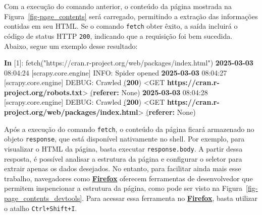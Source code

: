 \documentclass[
  12pt,
  a4paper,
]{scrreprt}
\newenvironment{Shaded}{}{}
\newcommand{\ErrorTok}[1]{\textcolor[rgb]{1.00,0.33,0.33}{\underline{#1}}}
\newcommand{\ExtensionTok}[1]{\textcolor[rgb]{0.84,0.23,0.29}{\textbf{#1}}}
\newcommand{\KeywordTok}[1]{\textcolor[rgb]{0.84,0.23,0.29}{#1}}
\newcommand{\NormalTok}[1]{\textcolor[rgb]{0.14,0.16,0.18}{#1}}
\newcommand{\OperatorTok}[1]{\textcolor[rgb]{0.14,0.16,0.18}{#1}}
\newcommand{\PreprocessorTok}[1]{\textcolor[rgb]{0.84,0.23,0.29}{#1}}
\newcommand{\SpecialStringTok}[1]{\textcolor[rgb]{0.01,0.18,0.38}{#1}}
\newcommand{\StringTok}[1]{\textcolor[rgb]{0.01,0.18,0.38}{#1}}
\begin{document}
Com a execução do comando anterior, o conteúdo da página mostrada na
Figura~\ref{fig-page_contents} será carregado, permitindo a extração das
informações contidas em seu HTML. Se o comando \texttt{fetch} obter
êxito, a saída incluirá o código de status HTTP \texttt{200}, indicando
que a requisição foi bem sucedida. Abaixo, segue um exemplo desse
resultado:

\begin{Shaded}
\begin{Highlighting}[]
\ExtensionTok{In} \PreprocessorTok{[}\SpecialStringTok{1}\PreprocessorTok{]}\NormalTok{: fetch}\ErrorTok{(}\StringTok{"https://cran.r{-}project.org/web/packages/index.html"}\KeywordTok{)}
\ExtensionTok{2025{-}03{-}03}\NormalTok{ 08:04:24 }\PreprocessorTok{[}\SpecialStringTok{scrapy.core.engine}\PreprocessorTok{]}\NormalTok{ INFO: Spider opened}
\ExtensionTok{2025{-}03{-}03}\NormalTok{ 08:04:27 }\PreprocessorTok{[}\SpecialStringTok{scrapy.core.engine}\PreprocessorTok{]}\NormalTok{ DEBUG: Crawled }\ErrorTok{(}\ExtensionTok{200}\KeywordTok{)} \OperatorTok{\textless{}}\NormalTok{GET}
\ExtensionTok{https://cran.r{-}project.org/robots.txt}\OperatorTok{\textgreater{}} \ErrorTok{(}\ExtensionTok{referer:}\NormalTok{ None}\KeywordTok{)}
\ExtensionTok{2025{-}03{-}03}\NormalTok{ 08:04:28 }\PreprocessorTok{[}\SpecialStringTok{scrapy.core.engine}\PreprocessorTok{]}\NormalTok{ DEBUG: Crawled }\ErrorTok{(}\ExtensionTok{200}\KeywordTok{)} \OperatorTok{\textless{}}\NormalTok{GET}
\ExtensionTok{https://cran.r{-}project.org/web/packages/index.html}\OperatorTok{\textgreater{}} \ErrorTok{(}\ExtensionTok{referer:}\NormalTok{ None}\KeywordTok{)}
\end{Highlighting}
\end{Shaded}

Após a execução do comando \texttt{fetch}, o conteúdo da página ficará
armazenado no objeto \texttt{response}, que está disponível nativamente
no shell. Por exemplo, para visualizar o HTML da página, basta executar
\texttt{response.body}. A partir dessa resposta, é possível analisar a
estrutura da página e configurar o seletor para extrair apenas os dados
desejados. No entanto, para facilitar ainda mais esse trabalho,
navegadores como
\href{https://www.mozilla.org/pt-BR/firefox/}{\textbf{Firefox}} oferecem
ferramentas de desenvolvedor que permitem inspencionar a estrutura da
página, como pode ser visto na Figura~\ref{fig-page_contents_devtools}.
Para acessar essa ferramenta no
\href{https://www.mozilla.org/pt-BR/firefox/}{\textbf{Firefox}}, basta
utilizar o atalho \texttt{Ctrl+Shift+I}.
\end{document}
